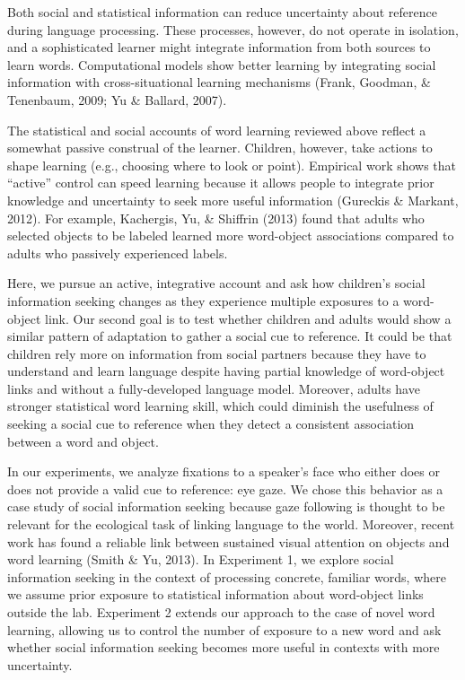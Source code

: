 \documentclass[10pt, letterpaper]{article}
\begin{document}
Both social and statistical information can reduce uncertainty about
reference during language processing. These processes, however, do not
operate in isolation, and a sophisticated learner might integrate
information from both sources to learn words. Computational models show
better learning by integrating social information with cross-situational
learning mechanisms (Frank, Goodman, \& Tenenbaum, 2009; Yu \& Ballard,
2007).

The statistical and social accounts of word learning reviewed above
reflect a somewhat passive construal of the learner. Children, however,
take actions to shape learning (e.g., choosing where to look or point).
Empirical work shows that ``active'' control can speed learning because
it allows people to integrate prior knowledge and uncertainty to seek
more useful information (Gureckis \& Markant, 2012). For example,
Kachergis, Yu, \& Shiffrin (2013) found that adults who selected objects
to be labeled learned more word-object associations compared to adults
who passively experienced labels.

Here, we pursue an active, integrative account and ask how children's
social information seeking changes as they experience multiple exposures
to a word-object link. Our second goal is to test whether children and
adults would show a similar pattern of adaptation to gather a social cue
to reference. It could be that children rely more on information from
social partners because they have to understand and learn language
despite having partial knowledge of word-object links and without a
fully-developed language model. Moreover, adults have stronger
statistical word learning skill, which could diminish the usefulness of
seeking a social cue to reference when they detect a consistent
association between a word and object.

In our experiments, we analyze fixations to a speaker's face who either
does or does not provide a valid cue to reference: eye gaze. We chose
this behavior as a case study of social information seeking because gaze
following is thought to be relevant for the ecological task of linking
language to the world. Moreover, recent work has found a reliable link
between sustained visual attention on objects and word learning (Smith
\& Yu, 2013). In Experiment 1, we explore social information seeking in
the context of processing concrete, familiar words, where we assume
prior exposure to statistical information about word-object links
outside the lab. Experiment 2 extends our approach to the case of novel
word learning, allowing us to control the number of exposure to a new
word and ask whether social information seeking becomes more useful in
contexts with more uncertainty.
\end{document}
